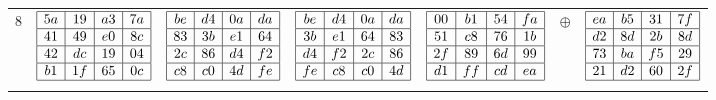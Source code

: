 \begin{longtable}{c c c c c c c}
    8 & 
    $\begin{array}{|c|c|c|c|}
      \hline
      5a & 19 & a3 & 7a \\ \hline
      41 & 49 & e0 & 8c \\ \hline
      42 & dc & 19 & 04 \\ \hline
      b1 & 1f & 65 & 0c \\ \hline
    \end{array}$ &
    $\begin{array}{|c|c|c|c|}
      \hline
      be & d4 & 0a & da \\ \hline
      83 & 3b & e1 & 64 \\ \hline
      2c & 86 & d4 & f2 \\ \hline
      c8 & c0 & 4d & fe \\ \hline
    \end{array}$ &
    $\begin{array}{|c|c|c|c|}
      \hline
      be & d4 & 0a & da \\ \hline
      3b & e1 & 64 & 83 \\ \hline
      d4 & f2 & 2c & 86 \\ \hline
      fe & c8 & c0 & 4d \\ \hline
    \end{array}$ &
    $\begin{array}{|c|c|c|c|}
      \hline
      00 & b1 & 54 & fa \\ \hline
      51 & c8 & 76 & 1b \\ \hline
      2f & 89 & 6d & 99 \\ \hline
      d1 & ff & cd & ea \\ \hline
    \end{array}$ &
    $\oplus$ &
    $\begin{array}{|c|c|c|c|}
      \hline
      ea & b5 & 31 & 7f \\ \hline
      d2 & 8d & 2b & 8d \\ \hline
      73 & ba & f5 & 29 \\ \hline
      21 & d2 & 60 & 2f \\ \hline
    \end{array}$ \\ \\
    

\end{longtable}

